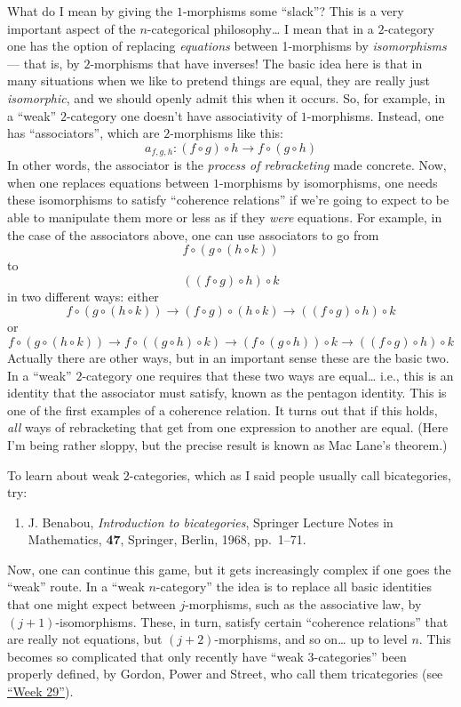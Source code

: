 \documentclass[12pt]{article}
\def\tightlist{}
\begin{document}
What do I mean by giving the \(1\)-morphisms some ``slack''? This is a
very important aspect of the \(n\)-categorical philosophy\ldots{} I mean
that in a \(2\)-category one has the option of replacing
\emph{equations} between 1-morphisms by \emph{isomorphisms} --- that is,
by \(2\)-morphisms that have inverses! The basic idea here is that in
many situations when we like to pretend things are equal, they are
really just \emph{isomorphic}, and we should openly admit this when it
occurs. So, for example, in a ``weak'' \(2\)-category one doesn't have
associativity of \(1\)-morphisms. Instead, one has ``associators'',
which are \(2\)-morphisms like this:
\[a_{f,g,h}: (f \circ g) \circ h \to f \circ (g \circ h)\] In other
words, the associator is the \emph{process of rebracketing} made
concrete. Now, when one replaces equations between \(1\)-morphisms by
isomorphisms, one needs these isomorphisms to satisfy ``coherence
relations'' if we're going to expect to be able to manipulate them more
or less as if they \emph{were} equations. For example, in the case of
the associators above, one can use associators to go from
\[f \circ (g \circ (h \circ k))\] to \[((f \circ g) \circ h) \circ k\]
in two different ways: either
\[f \circ (g \circ (h \circ k)) \to (f \circ g) \circ (h \circ k) \to ((f \circ g) \circ h) \circ k\]
or
\[f \circ (g \circ (h \circ k)) \to f \circ ((g \circ h) \circ k) \to (f \circ (g \circ h)) \circ k \to ((f \circ g) \circ h) \circ k\]
Actually there are other ways, but in an important sense these are the
basic two. In a ``weak'' \(2\)-category one requires that these two ways
are equal\ldots{} i.e., this is an identity that the associator must
satisfy, known as the pentagon identity. This is one of the first
examples of a coherence relation. It turns out that if this holds,
\emph{all} ways of rebracketing that get from one expression to another
are equal. (Here I'm being rather sloppy, but the precise result is
known as Mac Lane's theorem.)

To learn about weak \(2\)-categories, which as I said people usually
call bicategories, try:

\begin{enumerate}
\def\labelenumi{\arabic{enumi})}
\setcounter{enumi}{1}
\tightlist
\item
  J. Benabou, \emph{Introduction to bicategories}, Springer Lecture Notes in Mathematics,
  \textbf{47},  Springer, Berlin, 1968, pp.~1--71.
\end{enumerate}
\noindent
Now, one can continue this game, but it gets increasingly complex if one
goes the ``weak'' route. In a ``weak \(n\)-category'' the idea is to
replace all basic identities that one might expect between
\(j\)-morphisms, such as the associative law, by \((j+1)\)-isomorphisms.
These, in turn, satisfy certain ``coherence relations'' that are really
not equations, but \((j+2)\)-morphisms, and so on\ldots{} up to level
\(n\). This becomes so complicated that only recently have ``weak
\(3\)-categories'' been properly defined, by Gordon, Power and Street,
who call them tricategories (see \protect\hyperlink{week29}{``Week
29''}).
\end{document}
